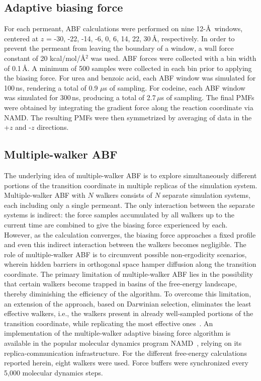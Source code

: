 \subsection{Adaptive biasing force}
\par     For each permeant, ABF calculations were performed on nine 12-\AA~windows, centered at $z$ = -30, -22, -14, -6, 0, 6, 14, 22, 30\,\AA, respectively. In order to prevent the permeant from leaving the boundary of a window, a wall force constant of 20 kcal/mol/\AA$^2$ was used. ABF forces were collected with a bin width of  0.1\,\AA. A minimum of 500 samples were collected in each bin prior to applying the biasing force. For urea and benzoic acid, each ABF window was simulated for 100\,ns, rendering a total of 0.9 $\mu$s of sampling. For codeine, each ABF window was simulated for 300\,ns, producing a total of 2.7\,$\mu$s of sampling. The final PMFs were obtained by integrating the gradient force along the reaction coordinate via NAMD. The resulting PMFs were then symmetrized by averaging of data in the +$z$ and -$z$ directions.

\subsection{Multiple-walker ABF}

The underlying idea of multiple-walker ABF is to explore simultaneously different portions of the transition coordinate in multiple replicas of the simulation system.
Multiple-walker ABF with $N$ walkers consists of $N$ separate simulation systems, each including only a single permeant. The only interaction between the separate systems is indirect: the force samples accumulated by all walkers up to the current time are combined to give the biasing force experienced by each. However, as the calculation converges, the biasing force approaches a fixed profile and even this indirect interaction between the walkers becomes negligible. The role of multiple-walker ABF is to circumvent possible non-ergodicity scenarios, wherein hidden barriers in orthogonal space hamper diffusion along the transition coordinate. The primary limitation of multiple-walker ABF lies in the possibility that certain walkers become trapped in basins of the free-energy landscape, thereby diminishing the efficiency of the algorithm.
To overcome this limitation, an extension of the approach, based on
Darwinian selection, eliminates the least effective walkers, i.e., the walkers
present in already well-sampled portions of the transition coordinate,
while replicating the most effective ones~\cite{Minoukadeh2010,Comer2014c}.
An implementation of the multiple-walker adaptive biasing force algorithm is available in the  popular molecular dynamics program NAMD~\cite{Phillips2005}, relying on its replica-communication infrastructure. For the different free-energy calculations reported herein, eight walkers were used. Force buffers were synchronized every 5,000 molecular dynamics steps.

